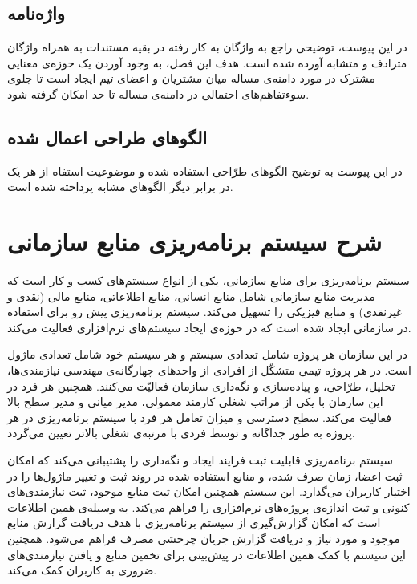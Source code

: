 \subsection{واژه‌نامه}
در این پیوست، توضیحی راجع به واژگان به کار رفته در بقیه مستندات به همراه واژگان مترادف و متشابه آورده شده است. هدف این فصل، به وجود آوردن یک حوزه‌ی معنایی مشترک در مورد دامنه‌ی مساله میان مشتریان و اعضای تیم ایجاد است  تا جلوی سوء‌تفاهم‌های احتمالی در دامنه‌ی مساله تا حد امکان گرفته شود.

\subsection{الگوهای طراحی اعمال شده}
در این پیوست به توضیح الگوهای طرّاحی استفاده شده و موضوعیت استفاه از هر یک در برابر دیگر الگوهای مشابه پرداخته شده است.

\newpage
\section{شرح سیستم برنامه‌ریزی منابع سازمانی}
سیستم برنامه‌ریزی برای منابع سازمانی، یکی از انواع سیستم‌های کسب و کار است که مدیریت منابع سازمانی شامل منابع انسانی، منابع اطلاعاتی، منابع مالی (نقدی و غیرنقدی) و منابع فیزیکی را تسهیل می‌کند. سیستم برنامه‌ریزی پیش رو برای استفاده در سازمانی ایجاد شده است که در حوزه‌ی ایجاد سیستم‌های نرم‌افزاری فعالیت می‌کند. \par
در این سازمان هر پروژه شامل تعدادی سیستم و هر سیستم خود شامل تعدادی ماژول است. در هر پروژه تیمی متشکّل از افرادی از واحدهای چهارگانه‌ی مهندسی نیازمندی‌ها، تحلیل، طرّاحی، و پیاده‌سازی و نگه‌داری سازمان فعالیّت می‌کنند. همچنین هر فرد در این سازمان با یکی از مراتب شغلی کارمند معمولی، مدیر میانی و مدیر سطح بالا فعالیت می‌کند. سطح دسترسی و میزان تعامل هر فرد با سیستم برنامه‌ریزی در هر پروژه به طور جداگانه و توسط فردی با مرتبه‌ی شغلی بالاتر تعیین می‌گردد. \par
سیستم برنامه‌ریزی قابلیت ثبت فرایند ایجاد و نگه‌داری را پشتیبانی می‌کند که امکان ثبت اعضا، زمان صرف شده، و منابع استفاده شده در روند ثبت و تغییر ماژول‌ها را در اختیار کاربران می‌گذارد. این سیستم همچنین امکان ثبت منابع موجود، ثبت نیازمندی‌های کنونی و ثبت اندازه‌ی پروژه‌های نرم‌افزاری را فراهم می‌کند. به وسیله‌ی همین اطلاعات است که امکان گزارش‌گیری از سیستم برنامه‌ریزی با هدف دریافت گزارش منابع موجود و مورد نیاز و دریافت گزارش جریان چرخشی مصرف فراهم می‌شود. همچنین این سیستم با کمک همین اطلاعات در پیش‌بینی برای تخمین منابع و یافتن نیازمندی‌های ضروری به کاربران کمک می‌کند. \par

